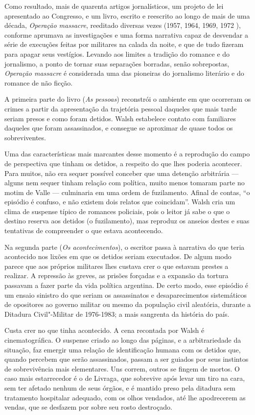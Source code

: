 Como resultado, mais de quarenta artigos jornalísticos, um projeto de
lei apresentado ao Congresso, e um livro, escrito e reescrito ao longo
de mais de uma década, \emph{Operação massacre}, reeditado diversas
vezes (1957, 1964, 1969, 1972 ), conforme aprumava as investigações e
uma forma narrativa capaz de desvendar a série de execuções feitas por
militares na calada da noite, e que de tudo fizeram para apagar seus
vestígios. Levando aos limites a tradição do romance e do jornalismo, a
ponto de tornar suas separações borradas, senão sobrepostas,
\emph{Operação massacre} é considerada uma das pioneiras do jornalismo
literário e do romance de não ficção.

A primeira parte do livro (\emph{As pessoas}) reconstrói o ambiente em
que ocorreram os crimes a partir da apresentação da trajetória pessoal
daqueles que mais tarde seriam presos e como foram detidos. Walsh
estabelece contato com familiares daqueles que foram assassinados, e
consegue se aproximar de quase todos os sobreviventes.

Uma das
características mais marcantes desse momento é a reprodução do campo de
perspectiva que tinham os detidos, a respeito do que lhes poderia
acontecer. Para muitos, não era sequer possível conceber que uma
detenção arbitrária --- alguns nem sequer tinham relação com política,
muito menos tomaram parte no motim de Valle --- culminaria em uma ordem
de fuzilamento. Afinal de contas, ``o episódio é confuso, e não existem
dois relatos que coincidam''. Walsh cria um clima de suspense típico de
romances policiais, pois o leitor já sabe o que o destino reserva aos
detidos (o fuzilamento), mas reproduz os anseios destes e suas
tentativas de compreender o que estava acontecendo.

Na segunda parte (\emph{Os acontecimentos}), o escritor passa à
narrativa do que teria acontecido nos lixões em que os detidos seriam
executados. De algum modo parece que aos próprios militares lhes custava
crer o que estavam prestes a realizar. A repressão às greves, as prisões
forçadas e a expansão da tortura passavam a fazer parte da vida política
argentina. De certo modo, esse episódio é um ensaio sinistro do que
seriam os assassinatos e desaparecimentos sistemáticos de opositores ao
governo militar ou mesmo da população civil aleatória, durante a
Ditadura Civil"-Militar de 1976-1983; a mais sangrenta da história do
país.

Custa crer no que tinha acontecido. A cena recontada por Walsh é cinematográfica.
O suspense criado ao longo das páginas, e a arbitrariedade da situação,
faz emergir uma relação de identificação humana com os detidos que,
quando percebem que serão assassinados, passam a ser guiados por
seus instintos de sobrevivência mais elementares. Uns correm, outros se fingem de mortos.
O caso mais estarrecedor é o de Livraga, que sobrevive após levar um
tiro na cara, sem ter afetado nenhum de seus órgãos, e é mantido preso
pela ditadura sem tratamento hospitalar adequado, com os olhos vendados,
até lhe apodrecerem as vendas, que se desfazem por sobre seu rosto
destroçado.


